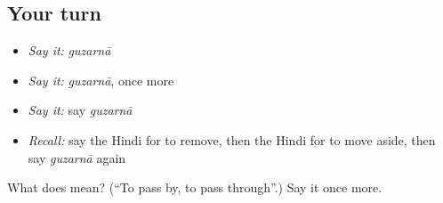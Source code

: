 \subsection*{Your turn}
\begin{itemize}
\raggedright
  \item \emph{Say it:} \emph{guzarnā}
  \item \emph{Say it:} \emph{guzarnā}, once more
  \item \emph{Say it:} say \emph{guzarnā}
  \item \emph{Recall:} say the Hindi for to remove, then the Hindi for to move aside, then say \emph{guzarnā} again
\end{itemize}

\begin{tcolorbox}[breakable,colback=teal!4,colframe=teal!35!black,title={Before you move on}]
What does  mean? (\textquotedblleft{}To pass by, to pass through\textquotedblright{}.) Say it once more.
\end{tcolorbox}
